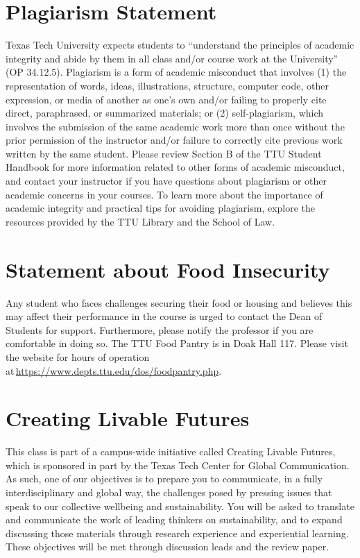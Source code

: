 \documentclass[12pt, notitlepage]{article}   	%
\begin{document}
{\section{Plagiarism Statement}
Texas Tech University expects students to “understand the principles of academic integrity 
and abide by them in all class and/or course work at the University” (OP 34.12.5). 
Plagiarism is a form of academic misconduct that involves (1) the representation of words, 
ideas, illustrations, structure, computer code, other expression, or media of another as 
one's own and/or failing to properly cite direct, paraphrased, or summarized materials; 
or (2) self-plagiarism, which involves the submission of the same academic work more than 
once without the prior permission of the instructor and/or failure to correctly cite 
previous work written by the same student. Please review Section B of the TTU 
Student Handbook for more information related to other forms of academic misconduct, 
and contact your instructor if you have questions about plagiarism or other 
academic concerns in your courses. To learn more about the importance of 
academic integrity and practical tips for avoiding plagiarism, explore the 
resources provided by the TTU Library and the School of Law.

\section{Statement about Food Insecurity}
Any student who faces challenges securing their food or housing and believes this may 
affect their performance in the course is urged to contact the Dean of Students for 
support. Furthermore, please notify the professor if you are comfortable in doing so. 
The TTU Food Pantry is in Doak Hall 117. Please visit the website for hours of 
operation at \url{https://www.depts.ttu.edu/dos/foodpantry.php}.

\section{Creating Livable Futures}
This class is part of a campus-wide initiative called Creating Livable Futures, 
which is sponsored in part by the Texas Tech Center for Global Communication. 
As such, one of our objectives is to prepare you to communicate, 
in a fully interdisciplinary and global way, the challenges posed by pressing issues 
that speak to our collective wellbeing and sustainability. You will be asked to translate 
and communicate the work of leading thinkers on sustainability, and to expand discussing 
those materials through research experience and experiential learning.
These objectives will be met through discussion leads and the review paper. 

}
\end{document}
